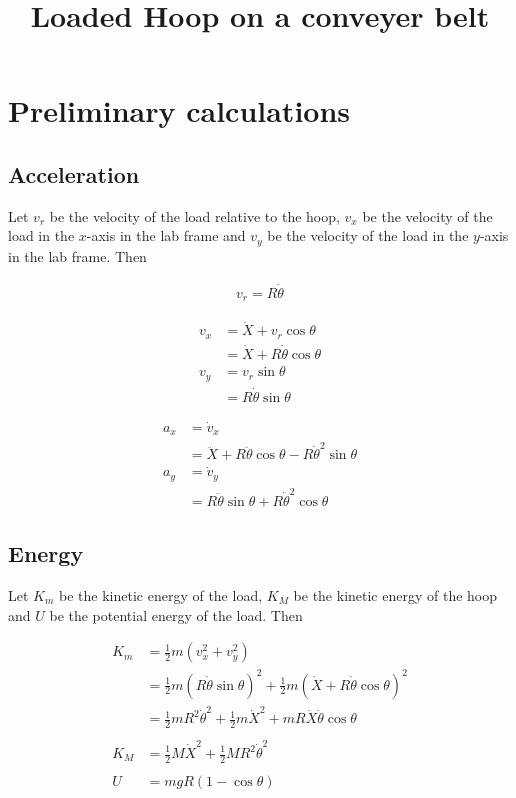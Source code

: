 \documentclass{article}
\title{Loaded Hoop on a conveyer belt}
\date{}
\newcommand{\half}{\frac{1}{2}}
\begin{document}
\maketitle

\section{Preliminary calculations}

\subsection{Acceleration}

Let $v_r$ be the velocity of the load relative to the hoop, $v_x$ be the velocity of the load in the $x$-axis in the lab frame and $v_y$ be the velocity of the load in the $y$-axis in the lab frame. Then

\begin{align*}
v_r = R \dot\theta
\end{align*}

\begin{align*}
v_x &= \dot X + v_r\cos\theta \\
&= \dot X + R \dot\theta\cos\theta \\
v_y &= v_r\sin\theta \\
&= R \dot\theta\sin\theta
\end{align*}

\begin{align*}
a_x &= \dot{v}_x \\
&= \ddot{X} + R\ddot\theta\cos\theta - R\dot\theta^2\sin\theta \\
a_y &= \dot{v}_y \\
&= R\ddot\theta\sin\theta + R\dot\theta^2\cos\theta
\end{align*}

\subsection{Energy}

Let $K_m$ be the kinetic energy of the load, $K_M$ be the kinetic energy of the hoop and $U$ be the potential energy of the load. Then

\begin{align*}
K_m &= \half m (v_x^2 + v_y^2) \\
&= \half m (R \dot\theta\sin\theta)^2 + \half m (\dot X + R\dot\theta\cos\theta)^2 \\
&= \half mR^2\dot\theta^2 + \half m\dot X^2 + mR\dot X\dot\theta\cos\theta \\
\\
K_M &= \half M \dot X^2 + \half M R^2 \dot\theta^2\\
\\
U &= mgR(1 - \cos\theta)
\end{align*}
\end{document}
